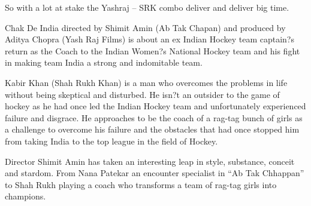 \documentclass[11pt]{article}
\begin{document}
So with a lot at stake the Yashraj – SRK combo deliver and deliver big time.

Chak De India directed by Shimit Amin (Ab Tak Chapan) and produced by Aditya Chopra (Yash Raj Films) is about an ex Indian Hockey team captain?s return as the Coach to the Indian Women?s National Hockey team and his fight in making team India a strong and indomitable team.

Kabir Khan (Shah Rukh Khan) is a man who overcomes the problems in life without being skeptical and disturbed. He isn?t an outsider to the game of hockey as he had once led the Indian Hockey team and unfortunately experienced failure and disgrace. He approaches to be the coach of a rag-tag bunch of girls as a challenge to overcome his failure and the obstacles that had once stopped him from taking India to the top league in the field of Hockey.

Director Shimit Amin has taken an interesting leap in style, substance, conceit and stardom. From Nana Patekar an encounter specialist in “Ab Tak Chhappan” to Shah Rukh playing a coach who transforms a team of rag-tag girls into champions.
\end{document}
